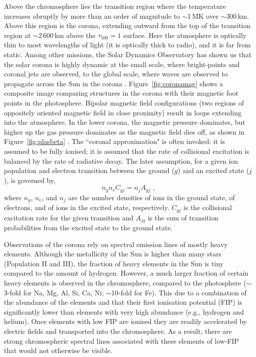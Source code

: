Above the chromosphere lies the transition region where the temperature increases abruptly by more than an order of magnitude to $\sim$1\,MK over $\sim$300\,km. Above this region is the corona,  extending outward from the top of the transition region at $\sim$2\,600\,km above the $\tau_{500}=1$ surface. Here the atmosphere is optically thin to most wavelengths of light (it is optically thick to radio), and it is far from static. Among other missions, the Solar Dynamics Observatory \citep[SDO;][]{Pesnell:2012} has shown us that the solar corona is highly dynamic at the small scale, where bright-points \citep{Vaiana:1973,PerezSuarez:2008} and coronal jets \citep{Innes:1997} are observed, to the global scale, where waves are observed to propagate across the Sun in the corona \citep{Long:2008}. Figure~\ref{fig:coronamag} shows a composite image comparing structures in the corona with their magnetic foot points in the photosphere. Bipolar magnetic field configurations (two regions of oppositely oriented magnetic field in close proximity) result in loops extending into the atmosphere. In the lower corona, the magnetic pressure dominates, but higher up the gas pressure dominates as the magnetic field dies off, as shown in Figure~\ref{fig:plasbeta} \citep{Gary:2001}. The ``coronal approximation" is often invoked: it is assumed to be fully ionised; it is assumed that the rate of collisional excitation is balanced by the rate of radiative decay. The later assumption, for a given ion population and electron transition between the ground ($g$) and an excited state ($j$), is governed by,
\begin{equation} 
n_g n_e C_{gj} = n_j A_{gj} \mbox{ ,}
\end{equation}
where $n_g$, $n_e$, and $n_j$ are the number densities of ions in the ground state, of electrons, and of ions in the excited state, respectively. $C_{gj}$ is the collisional excitation rate for the given transition and $A_{jg}$ is the sum of transition probabilities from the excited state to the ground state.

Observations of the corona rely on spectral emission lines of mostly heavy elements. Although the metallicity of the Sun is higher than many stars (Population II and III), the fraction of heavy elements in the Sun is tiny compared to the amount of hydrogen. However, a much larger fraction of certain heavy elements is observed in the chromosphere, compared to the photosphere ($\sim$3-fold for Na, Mg, Al, Si, Ca, Ni; $\sim$10-fold for Fe). This due to a combination of the abundance of the elements and that their first ionisation potential (FIP) is significantly lower than elements with very high abundance (e.g., hydrogen and helium). Once elements with low FIP are ionised they are readily accelerated by electric fields and transported into the chromosphere. As a result, there are strong chromospheric spectral lines associated with these elements of low-FIP that would not otherwise be visible.

